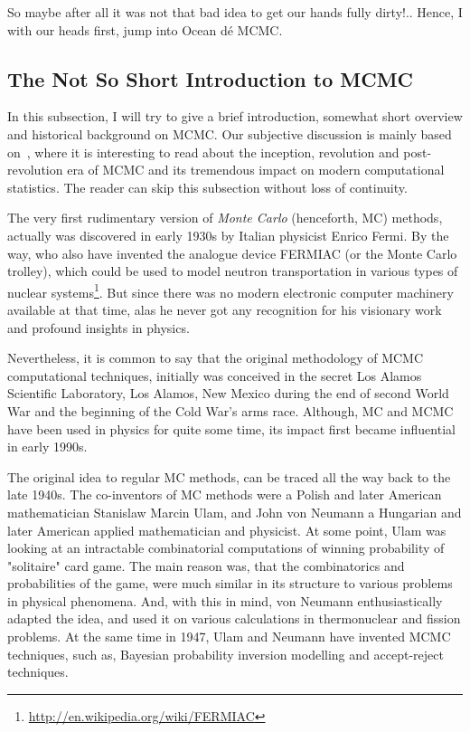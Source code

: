 \documentclass[a4paper,11pt,english]{article}
\begin{document}
		So maybe after all it was not that bad idea to get our hands fully dirty!.. Hence, I with our heads first, jump into Ocean dé MCMC. 

		
		\subsection{The Not So Short Introduction to MCMC} 

		In this subsection, I will try to give a brief introduction, somewhat short overview and historical background on MCMC. Our subjective 
		discussion is mainly based on~\cite{robert}, where it is interesting to read about the inception, revolution and post-revolution era of MCMC and 
		its tremendous impact on modern computational statistics. The reader can skip this subsection without loss of continuity.
		
		The very first rudimentary version of \textit{Monte Carlo} (henceforth, MC) methods, actually was discovered in early 1930s by Italian physicist 
		Enrico Fermi. By the way, who also have invented the analogue device FERMIAC (or the Monte Carlo trolley), which could be used to model neutron 
		transportation in various types of nuclear systems\footnote{\url{http://en.wikipedia.org/wiki/FERMIAC}}. But since there was no modern electronic 
		computer machinery available at that time, alas he never got any recognition for his visionary work and profound insights in physics. 
		
		Nevertheless, it is common to say that the original methodology of MCMC computational techniques, initially was conceived in the secret Los 
		Alamos Scientific Laboratory, Los Alamos, New Mexico during the end of second World War and the beginning of the Cold War's arms race. Although, 
		MC and MCMC have been used in physics for quite some time, its impact first became influential in early 1990s. 
		
		The original idea to regular MC methods, can be traced all the way back to the late 1940s. The co-inventors of MC methods were a Polish and 
		later American mathematician Stanislaw Marcin Ulam, and John von Neumann a Hungarian and later American applied mathematician and physicist. 
		At some point, Ulam was looking at an intractable combinatorial computations of winning probability of "solitaire" card game. The main reason 
		was, that the combinatorics and probabilities of the game, were much similar in its structure to various problems in physical phenomena. And, 
		with this in mind, von Neumann enthusiastically adapted the idea, and used it on various calculations in thermonuclear and fission problems.
		At the same time in 1947, Ulam and Neumann have invented MCMC techniques, such as, Bayesian probability inversion modelling and accept-reject 
		techniques.   
		
\end{document}
